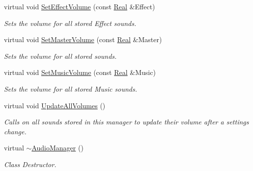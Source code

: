 \begin{DoxyCompactItemize}
virtual void \hyperlink{classMezzanine_1_1AudioManager_a390953c8eecd4446854b1e4c1c431f5a}{SetEffectVolume} (const \hyperlink{namespaceMezzanine_a726731b1a7df72bf3583e4a97282c6f6}{Real} \&Effect)
\begin{DoxyCompactList}\small\item\em Sets the volume for all stored Effect sounds. \item\end{DoxyCompactList}\item 
virtual void \hyperlink{classMezzanine_1_1AudioManager_ae3120d9f9877113fbe019f63a451f155}{SetMasterVolume} (const \hyperlink{namespaceMezzanine_a726731b1a7df72bf3583e4a97282c6f6}{Real} \&Master)
\begin{DoxyCompactList}\small\item\em Sets the volume for all stored sounds. \item\end{DoxyCompactList}\item 
virtual void \hyperlink{classMezzanine_1_1AudioManager_a8df0f5fb1e426a59cfafee4f54201db7}{SetMusicVolume} (const \hyperlink{namespaceMezzanine_a726731b1a7df72bf3583e4a97282c6f6}{Real} \&Music)
\begin{DoxyCompactList}\small\item\em Sets the volume for all stored Music sounds. \item\end{DoxyCompactList}\item 
virtual void \hyperlink{classMezzanine_1_1AudioManager_a1171a0dece85578907c6bbf82da56936}{UpdateAllVolumes} ()
\begin{DoxyCompactList}\small\item\em Calls on all sounds stored in this manager to update their volume after a settings change. \item\end{DoxyCompactList}\item 
virtual \hyperlink{classMezzanine_1_1AudioManager_aed11c120ed062fa13a0881099859a957}{$\sim$AudioManager} ()
\begin{DoxyCompactList}\small\item\em Class Destructor. \item\end{DoxyCompactList}\end{DoxyCompactItemize}
